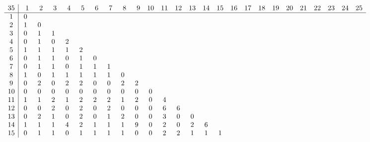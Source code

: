 \begin{landscape}
\[
\begin{array}{c|ccccccccccccccccccccccccc}\addcontentsline{lot}{table}{\protect\numberline{}Dimensions of the Kernel of $\mathcal{L}_{r,c,35}$}
35&  \phantom{0}1&  \phantom{0}2&  \phantom{0}3&  \phantom{0}4&  \phantom{0}5&  \phantom{0}6&  \phantom{0}7&  \phantom{0}8&  \phantom{0}9& 10& 11& 12& 13& 14& 15& 16& 17& 18& 19& 20& 21& 22& 23& 24& 25\\
\hline
 1&  0&   &   &   &   &   &   &   &   &   &   &   &   &   &   &   &   &   &   &   &   &   &   &   &   \\
 2&  1&  0&   &   &   &   &   &   &   &   &   &   &   &   &   &   &   &   &   &   &   &   &   &   &   \\
 3&  0&  1&  1&   &   &   &   &   &   &   &   &   &   &   &   &   &   &   &   &   &   &   &   &   &   \\
 4&  0&  1&  0&  2&   &   &   &   &   &   &   &   &   &   &   &   &   &   &   &   &   &   &   &   &   \\
 5&  1&  1&  1&  1&  2&   &   &   &   &   &   &   &   &   &   &   &   &   &   &   &   &   &   &   &   \\
 6&  0&  1&  1&  0&  1&  0&   &   &   &   &   &   &   &   &   &   &   &   &   &   &   &   &   &   &   \\
 7&  0&  1&  1&  0&  1&  1&  1&   &   &   &   &   &   &   &   &   &   &   &   &   &   &   &   &   &   \\
 8&  1&  0&  1&  1&  1&  1&  1&  0&   &   &   &   &   &   &   &   &   &   &   &   &   &   &   &   &   \\
 9&  0&  2&  0&  2&  2&  0&  0&  2&  2&   &   &   &   &   &   &   &   &   &   &   &   &   &   &   &   \\
10&  0&  0&  0&  0&  0&  0&  0&  0&  0&  0&   &   &   &   &   &   &   &   &   &   &   &   &   &   &   \\
11&  1&  1&  2&  1&  2&  2&  2&  1&  2&  0&  4&   &   &   &   &   &   &   &   &   &   &   &   &   &   \\
12&  0&  0&  2&  0&  2&  0&  2&  0&  0&  0&  6&  6&   &   &   &   &   &   &   &   &   &   &   &   &   \\
13&  0&  2&  1&  0&  2&  0&  1&  2&  0&  0&  3&  0&  0&   &   &   &   &   &   &   &   &   &   &   &   \\
14&  1&  1&  1&  4&  2&  1&  1&  1&  9&  0&  2&  0&  2&  6&   &   &   &   &   &   &   &   &   &   &   \\
15&  0&  1&  1&  0&  1&  1&  1&  1&  0&  0&  2&  2&  1&  1&  1&   &   &   &   &   &   &   &   &   &   \\

\end{array}\]
\end{landscape}
